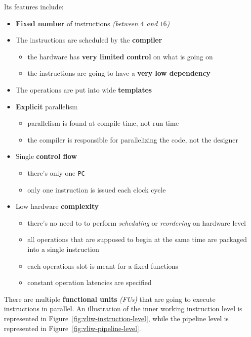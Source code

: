 \documentclass[english]{article}
\begin{document}
\bigskip
Its features include:

\begin{itemize}
  \item \textbf{Fixed number} of instructions \textit{(between \(4\) and \(16\))}
  \item The instructions are scheduled by the \textbf{compiler}
        \begin{itemize}
          \item the hardware has \textbf{very limited control} on what is going on
          \item the instructions are going to have a \textbf{very low dependency}
        \end{itemize}
  \item The operations are put into wide \textbf{templates}
  \item \textbf{Explicit} parallelism
        \begin{itemize}
          \item parallelism is found at compile time, not run time
          \item the compiler is responsible for parallelizing the code, not the designer
        \end{itemize}
  \item Single \textbf{control flow}
        \begin{itemize}
          \item there's only one \texttt{PC}
          \item only one instruction is issued each clock cycle
        \end{itemize}
  \item Low hardware \textbf{complexity}
        \begin{itemize}
          \item there's no need to to perform \textit{scheduling} or \textit{reordering} on hardware level
          \item all operations that are supposed to begin at the same time are packaged into a single instruction
          \item each operations slot is meant for a fixed functions
          \item constant operation latencies are specified
        \end{itemize}
\end{itemize}

There are multiple \textbf{functional units} \textit{(FUs)} that are going to execute instructions in parallel.
An illustration of the inner working instruction level is represented in Figure~\ref{fig:vliw-instruction-level}, while the pipeline level is represented in Figure~\ref{fig:vliw-pipeline-level}.
\end{document}
